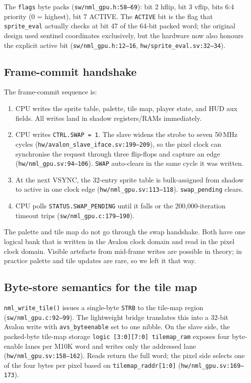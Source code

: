\documentclass[11pt,letterpaper]{article}
\begin{document}
The \texttt{flags} byte packs (\texttt{sw/nml\_gpu.h:58--69}): bit 2 hflip,
bit 3 vflip, bits 6:4 priority (0 = highest), bit 7 ACTIVE. The
\texttt{ACTIVE} bit is the flag that \texttt{sprite\_eval} actually checks at
bit 47 of the 64-bit packed word; the original design used sentinel
coordinates exclusively, but the hardware now also honours the explicit
active bit (\texttt{sw/nml\_gpu.h:12--16}, \texttt{hw/sprite\_eval.sv:32--34}).

\subsection{Frame-commit handshake}

The frame-commit sequence is:

\begin{enumerate}[leftmargin=*,nosep]
  \item CPU writes the sprite table, palette, tile map, player state, and
    HUD aux fields. All writes land in shadow registers/RAMs immediately.
  \item CPU writes \texttt{CTRL.SWAP = 1}. The slave widens the strobe to
    seven 50\,MHz cycles (\texttt{hw/avalon\_slave\_iface.sv:199--209}),
    so the pixel clock can synchronise the request through three flip-flops
    and capture an edge (\texttt{hw/nml\_gpu.sv:94--106}). \texttt{SWAP}
    auto-clears in the same cycle it was written.
  \item At the next VSYNC, the 32-entry sprite table is bulk-assigned from
    shadow to active in one clock edge (\texttt{hw/nml\_gpu.sv:113--118}).
    \texttt{swap\_pending} clears.
  \item CPU polls \texttt{STATUS.SWAP\_PENDING} until it falls or the
    200{,}000-iteration timeout trips (\texttt{sw/nml\_gpu.c:179--190}).
\end{enumerate}

The palette and tile map do not go through the swap handshake. Both have one
logical bank that is written in the Avalon clock domain and read in the pixel
clock domain. Visible artefacts from mid-frame writes are possible in theory;
in practice palette and tile updates are rare, so we left it that way.

\subsection{Byte-store semantics for the tile map}

\texttt{nml\_write\_tile()} issues a single-byte \texttt{STRB} to the tile-map
region (\texttt{sw/nml\_gpu.c:92--99}). The lightweight bridge translates this
into a 32-bit Avalon write with \texttt{avs\_byteenable} set to one nibble.
On the slave side, the packed-byte tile-map storage \texttt{logic [3:0][7:0]
tilemap\_ram} exposes four byte-enable lanes per M10K word and writes only
the addressed lane (\texttt{hw/nml\_gpu.sv:158--162}). Reads return the full
word; the pixel side selects one of the four bytes per pixel based on
\texttt{tilemap\_raddr[1:0]} (\texttt{hw/nml\_gpu.sv:169--173}).
\end{document}
